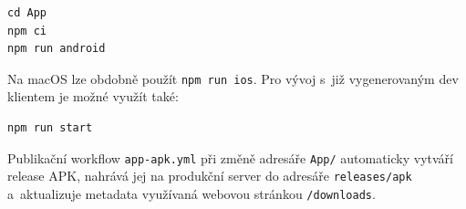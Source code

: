 \begin{verbatim}
cd App
npm ci
npm run android
\end{verbatim}

Na macOS lze obdobně použít \texttt{npm run ios}. Pro vývoj s~již
vygenerovaným dev klientem je možné využít také:

\begin{verbatim}
npm run start
\end{verbatim}

Publikační workflow \texttt{app-apk.yml} při změně adresáře \texttt{App/}
automaticky vytváří release APK, nahrává jej na produkční server do
adresáře \texttt{releases/apk} a~aktualizuje metadata využívaná webovou
stránkou \texttt{/downloads}.
